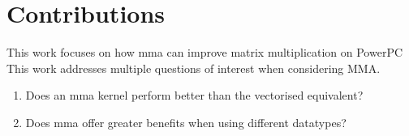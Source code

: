 \documentclass[\main/thesis.tex]{subfiles}
\begin{document}
\section{Contributions}
This work focuses on how \gls{mma} can improve matrix multiplication on PowerPC
This work addresses multiple questions of interest when considering MMA.
\begin{enumerate}
  \item
    Does an \gls{mma} kernel perform better than the vectorised equivalent?
  \item
    Does \gls{mma} offer greater benefits when using different datatypes?
\end{enumerate}
\end{document}

